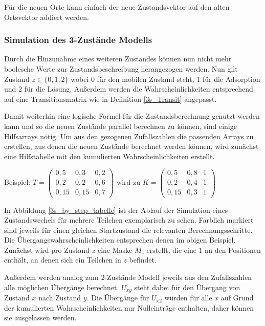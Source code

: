 Für die neuen Orte kann einfach der neue Zustandsvektor auf den alten Ortsvektor addiert werden.


\subsubsection{Simulation des 3-Zustände Modells}

Durch die Hinzunahme eines weiteren Zustandes können nun nicht mehr boolesche Werte zur Zustandsbeschreibung herangezogen werden. Nun gilt Zustand $z \in \{0, 1, 2\}$  wobei $0$ für den mobilen Zustand steht, $1$ für die Adsorption und $2$ für die Lösung. Außerdem werden die Wahrscheinlichkeiten entsprechend auf eine Transitionsmatrix wie in Definition \ref{3s_Transit} angepasst.

Damit weiterhin eine logische Formel für die Zustandsberechnung genutzt werden kann und so die neuen Zustände parallel berechnen zu können, sind einige Hilfsarrays nötig.%
Um aus den gezogenen Zufallszahlen die passenden Arrays zu erstellen, aus denen die neuen Zustände berechnet werden können, wird zunächst eine Hilfstabelle mit den kumulierten Wahrscheinlichkeiten erstellt. %

Beispiel:
$T= 
\begin{pmatrix}
0,5 & 0,3 & 0,2 \\
0,2 & 0,2 & 0,6 \\
0,15 & 0,15 & 0,7 
\end{pmatrix}
$  wird zu 
$K= 
\begin{pmatrix}
0,5 & 0,8 & 1 \\
0,2 & 0,4 & 1 \\
0,15 & 0,3 & 1 
\end{pmatrix}
$ 

In Abbildung \ref{3s_by_step_tabelle} ist der Ablauf der Simulation eines Zustandswechels für mehrere Teilchen exemplarisch zu sehen. Farblich markiert sind jeweils für einen gleichen Startzustand die relevanten Berechnungsschritte. Die Übergangswahrscheinlichkeiten entsprechen denen im obigen Beispiel.
Zunächst wird pro Zustand $z$ eine Maske $M_z$ erstellt, die eine $1$ an den Positionen enthält, an denen sich ein Teilchen in $z$ befindet. 

Außerdem werden analog zum 2-Zustände Modell jeweils aus den Zufallszahlen alle möglichen Übergänge berechnet. $U_{xy}$ steht dabei für den Übergang von Zustand $x$ nach Zustand $y$. Die Übergänge für $U_{x2}$ würden für alle $x$ auf Grund der kumulierten Wahrscheinlichkeiten nur Nulleinträge enthalten, daher können sie ausgelassen werden. 

